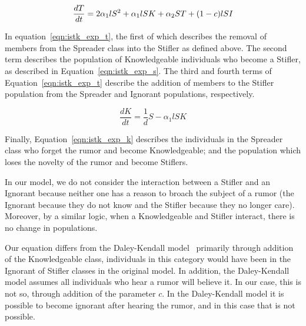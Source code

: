 \begin{equation}
\label{eqn:istk_exp_t} \frac{dT}{dt} = 2 \alpha_1l S^2 + \alpha_1l SK + \alpha_2 ST + (1-c)lSI \\
\end{equation}

In equation~\ref{eqn:istk_exp_t}, the first of which describes the removal of members from the Spreader class into the Stifler as defined above.
The second term describes the population of Knowledgeable individuals who become a Stifler, as described in Equation~\ref{eqn:istk_exp_s}.
The third and fourth terms of Equation~\ref{eqn:istk_exp_t} describe the addition of members to the Stifler population from the Spreader and Ignorant populations, respectively.

\begin{equation}
\label{eqn:istk_exp_k} \frac{dK}{dt} = \frac{1}{d}S - \alpha_1l SK
\end{equation}

Finally, Equation~\ref{eqn:istk_exp_k} describes the individuals in the Spreader class who forget the rumor and become Knowledgeable; and the population which loses the novelty of the rumor and become Stiflers.

In our model, we do not consider the interaction between a Stifler and an Ignorant because neither one has a reason to broach the subject of a rumor (the Ignorant because they do not know and the Stifler because they no longer care).
Moreover, by a similar logic, when a Knowledgeable and Stifler interact, there is no change in populations.


Our equation differs from the Daley-Kendall model~\cite{daley-1965} primarily through addition of the Knowledgeable class, individuals in this category would have been in the Ignorant of Stifler classes in the original model.
In addition, the Daley-Kendall model assumes all individuals who hear a rumor will believe it.
In our case, this is not so, through addition of the parameter $ c $.
In the Daley-Kendall model it is possible to become ignorant after hearing the rumor, and in this case that is not possible.
